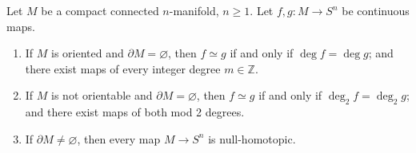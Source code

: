 Let $M$ be a compact connected $n$-manifold, $n \geqslant 1$. Let $f, g: M \to S^n$ be continuous maps.

\begin{enumerate}
\item[(a)] If $M$ is oriented and $\partial M = \varnothing$, then $f \simeq g$ if and only if $\deg f = \deg g$; and there exist maps of every integer degree $m \in \mathbb{Z}$.

\item[(b)] If $M$ is not orientable and $\partial M = \varnothing$, then $f \simeq g$ if and only if $\deg_2 f = \deg_2 g$; and there exist maps of both mod 2 degrees.

\item[(c)] If $\partial M \neq \varnothing$, then every map $M \to S^n$ is null-homotopic.
\end{enumerate}
